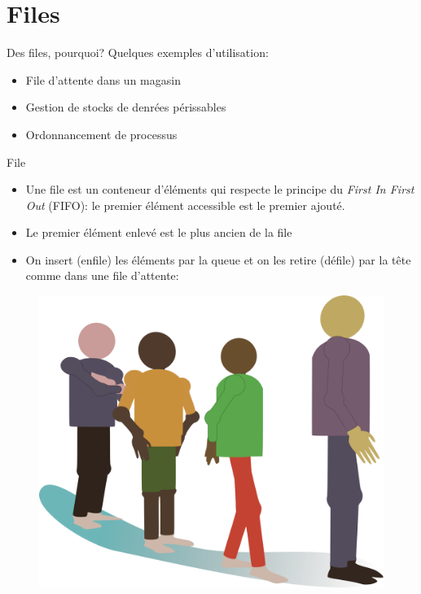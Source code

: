 \documentclass[12pt,a4paper]{beamer}
\begin{document}
\begin{frame}
\tableofcontents
\end{frame}

\section{Files}

\begin{frame}{Des files, pourquoi?}
Quelques exemples d'utilisation:
\begin{itemize}
\item File d'attente dans un magasin
\item Gestion de stocks de denrées périssables
\item Ordonnancement de processus
\end{itemize}
\end{frame}


\begin{frame}{File}{}
\begin{itemize}
\item Une file est un conteneur d'éléments qui respecte le principe du \textcolor{blueemph}{\textit{First In First Out}} (FIFO): le premier élément accessible est le premier ajouté.
\item Le premier élément enlevé est le plus ancien de la file
\item On insert (enfile) les éléments par la \textcolor{blueemph}{queue} et on les retire (défile) par la \textcolor{blueemph}{tête} comme dans une file d'attente:
\end{itemize}
\begin{figure}
\includegraphics[scale=0.05]{figs/queue.png}
\end{figure}

\end{frame}
\end{document}
